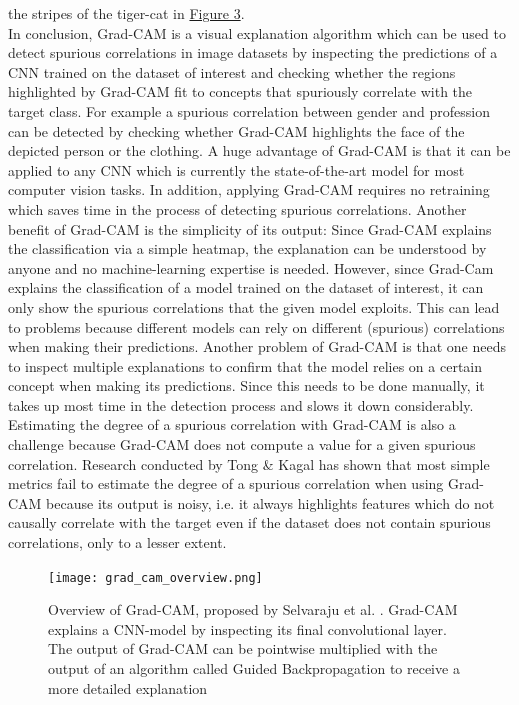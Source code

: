 \documentclass{article}
\begin{document}
the stripes of the tiger-cat in \hyperref[fig:gradcam]{Figure 3}. \\
In conclusion, Grad-CAM is a visual explanation algorithm which can be used to detect spurious correlations
in image datasets by inspecting the predictions of a CNN trained on the dataset of interest and checking whether the regions
highlighted by Grad-CAM fit to concepts that spuriously correlate with the target class.
For example a spurious correlation between gender and profession can be detected by checking whether Grad-CAM
highlights the face of the depicted person or the clothing. 
A huge advantage of Grad-CAM is that it can be applied to any CNN which is currently the state-of-the-art model
for most computer vision tasks. In addition, applying Grad-CAM requires no retraining which saves time in the process
of detecting spurious correlations. Another benefit of Grad-CAM is the simplicity of its output:
Since Grad-CAM explains the classification via a  simple heatmap, the explanation can be understood by anyone
and no machine-learning expertise is needed. 
However, since Grad-Cam explains the classification of a model trained on the dataset of interest,
it can only show the spurious correlations that the given model exploits. This can lead to problems because
different models can rely on different (spurious) correlations when making their predictions.
Another problem of Grad-CAM is that one needs to inspect multiple explanations to confirm that the model
relies on a certain concept when making its predictions. Since this needs to be done manually, it takes up
most time in the detection process and slows it down considerably. Estimating the degree of a spurious correlation
with Grad-CAM is also a challenge because Grad-CAM does not compute a value for a given spurious correlation.
Research conducted by Tong \& Kagal \cite{tong2020investigating} has shown that most simple metrics fail
to estimate the degree of a spurious correlation when using Grad-CAM because its output is noisy, i.e. it always
highlights features which do not causally correlate with the target even if the dataset does not contain spurious
correlations, only to a lesser extent.

\begin{figure}
    \centering
    \texttt{[image: grad\_cam\_overview.png]}
    \caption{Overview of Grad-CAM, proposed by Selvaraju et al. \cite{Selvaraju_2017_ICCV}. Grad-CAM explains
    a CNN-model by inspecting its final convolutional layer. The output of Grad-CAM can be pointwise multiplied
    with the output of an algorithm called Guided Backpropagation \cite{springenberg2015striving} to receive a
    more detailed explanation}
    \label{fig:gradcam}
\end{figure}
\end{document}
